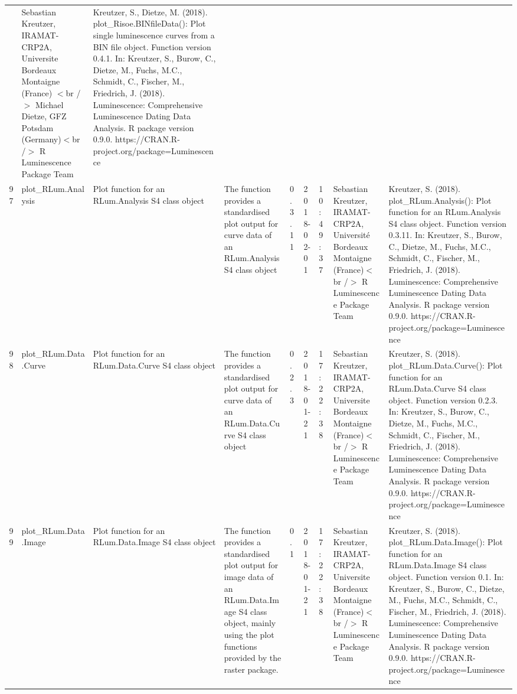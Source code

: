\begin{table}[ht]
\begin{tabular}{rllllllll}
 & Sebastian Kreutzer, IRAMAT-CRP2A, Universite Bordeaux Montaigne (France) $<$br /$>$ Michael Dietze, GFZ Potsdam (Germany)$<$br /$>$  R Luminescence Package Team & Kreutzer, S., Dietze, M. (2018). plot\_Risoe.BINfileData(): Plot single luminescence curves from a BIN file object. Function version 0.4.1. In: Kreutzer, S., Burow, C., Dietze, M., Fuchs, M.C., Schmidt, C., Fischer, M., Friedrich, J. (2018). Luminescence: Comprehensive Luminescence Dating Data Analysis. R package version 0.9.0. https://CRAN.R-project.org/package=Luminescence
 \\ 
  97 & plot\_RLum.Analysis & Plot function for an RLum.Analysis S4 class object & The function provides a standardised plot output for curve data of an RLum.Analysis S4 class object & 0.3.11 & 2018-02-01 & 10:49:37
 & Sebastian Kreutzer, IRAMAT-CRP2A, Université Bordeaux Montaigne (France)$<$br /$>$  R Luminescence Package Team & Kreutzer, S. (2018). plot\_RLum.Analysis(): Plot function for an RLum.Analysis S4 class object. Function version 0.3.11. In: Kreutzer, S., Burow, C., Dietze, M., Fuchs, M.C., Schmidt, C., Fischer, M., Friedrich, J. (2018). Luminescence: Comprehensive Luminescence Dating Data Analysis. R package version 0.9.0. https://CRAN.R-project.org/package=Luminescence
 \\ 
  98 & plot\_RLum.Data.Curve & Plot function for an RLum.Data.Curve S4 class object & The function provides a standardised plot output for curve data of an RLum.Data.Curve S4 class object & 0.2.3 & 2018-01-21 & 17:22:38
 & Sebastian Kreutzer, IRAMAT-CRP2A, Universite Bordeaux Montaigne (France)$<$br /$>$  R Luminescence Package Team & Kreutzer, S. (2018). plot\_RLum.Data.Curve(): Plot function for an RLum.Data.Curve S4 class object. Function version 0.2.3. In: Kreutzer, S., Burow, C., Dietze, M., Fuchs, M.C., Schmidt, C., Fischer, M., Friedrich, J. (2018). Luminescence: Comprehensive Luminescence Dating Data Analysis. R package version 0.9.0. https://CRAN.R-project.org/package=Luminescence
 \\ 
  99 & plot\_RLum.Data.Image & Plot function for an  RLum.Data.Image  S4 class object & The function provides a standardised plot output for image data of an RLum.Data.Image S4 class object, mainly using the plot functions provided by the  raster  package. & 0.1 & 2018-01-21 & 17:22:38
 & Sebastian Kreutzer, IRAMAT-CRP2A, Universite Bordeaux Montaigne (France)$<$br /$>$  R Luminescence Package Team & Kreutzer, S. (2018). plot\_RLum.Data.Image(): Plot function for an RLum.Data.Image S4 class object. Function version 0.1. In: Kreutzer, S., Burow, C., Dietze, M., Fuchs, M.C., Schmidt, C., Fischer, M., Friedrich, J. (2018). Luminescence: Comprehensive Luminescence Dating Data Analysis. R package version 0.9.0. https://CRAN.R-project.org/package=Luminescence

\end{tabular}
\end{table}
